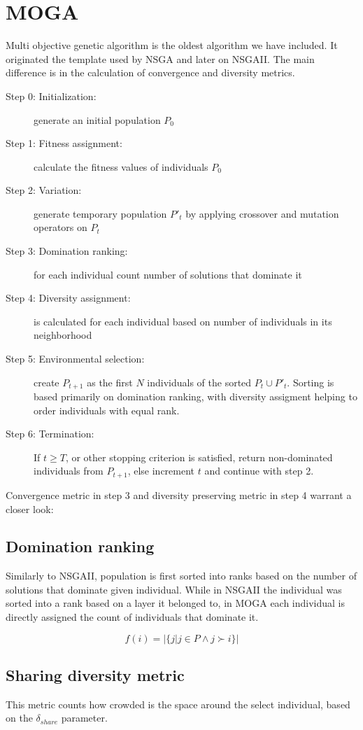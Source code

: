 \documentclass[12pt,oneside]{fithesis2}
\begin{document}
\section{MOGA}
Multi objective genetic algorithm is the oldest algorithm we have included. It originated the template used by NSGA and later on NSGAII. The main difference is in the calculation of convergence and diversity metrics.

\begin{description}
	\item[Step 0: Initialization:] generate an initial population $P_0$ 
	\item[Step 1: Fitness assignment:] calculate the fitness values of individuals $P_0$
	\item[Step 2: Variation:] generate temporary population $P'_t$ by applying crossover and mutation operators on $P_t$
	\item[Step 3: Domination ranking:] for each individual count number of solutions that dominate it
	\item[Step 4: Diversity assignment:] is calculated for each individual based on number of individuals in its neighborhood
	\item[Step 5: Environmental selection:] create $P_{t+1}$ as the first $N$ individuals of the sorted $P_t \cup P'_t$. Sorting is based primarily on domination ranking, with diversity assigment helping to order individuals with equal rank.
	\item[Step 6: Termination:] If $t \geq T$, or other stopping criterion is satisfied, return non-dominated individuals from $P_{t+1}$, else increment $t$ and continue with step 2.
\end{description}

Convergence metric in step 3 and diversity preserving metric in step 4 warrant a closer look:

\subsection{Domination ranking}
Similarly to NSGAII, population is first sorted into ranks based on the number of solutions that dominate given individual. While in NSGAII the individual was sorted into a rank based on a layer it belonged to, in MOGA each individual is directly assigned the count of individuals that dominate it.

$$f(i) = |\{j|j \in P \land j \succ i\}|$$

\subsection{Sharing diversity metric}
This metric counts how crowded is the space around the select individual, based on the $\delta_{share}$ parameter.
\end{document}
